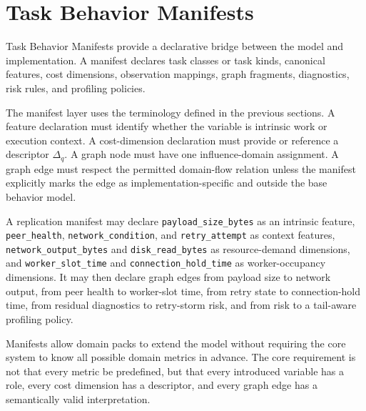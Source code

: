 \section{Task Behavior Manifests}
\label{sec:task-behavior-manifests}

Task Behavior Manifests provide a declarative bridge between the model and
implementation. A manifest declares task classes or task kinds, canonical
features, cost dimensions, observation mappings, graph fragments, diagnostics,
risk rules, and profiling policies.

The manifest layer uses the terminology defined in the previous sections. A
feature declaration must identify whether the variable is intrinsic work or
execution context. A cost-dimension declaration must provide or reference a
descriptor $\Delta_q$. A graph node must have one influence-domain assignment.
A graph edge must respect the permitted domain-flow relation unless the manifest
explicitly marks the edge as implementation-specific and outside the base
behavior model.

A replication manifest may declare \texttt{payload\_size\_bytes} as an
intrinsic feature, \texttt{peer\_health}, \texttt{network\_condition}, and
\texttt{retry\_attempt} as context features, \texttt{network\_output\_bytes}
and \texttt{disk\_read\_bytes} as resource-demand dimensions, and
\texttt{worker\_slot\_time} and \texttt{connection\_hold\_time} as
worker-occupancy dimensions. It may then declare graph edges from payload size
to network output, from peer health to worker-slot time, from retry state to
connection-hold time, from residual diagnostics to retry-storm risk, and from
risk to a tail-aware profiling policy.

Manifests allow domain packs to extend the model without requiring the core
system to know all possible domain metrics in advance. The core requirement is
not that every metric be predefined, but that every introduced variable has a
role, every cost dimension has a descriptor, and every graph edge has a
semantically valid interpretation.
